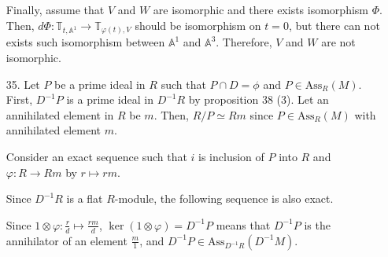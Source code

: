 \documentclass[12pt]{article}
\begin{document}
\begin{enumerate}
Finally, assume that $V$ and $W$ are isomorphic and there exists isomorphism $\Phi$. Then, $d\Phi:\mathbb{T}_{t, \mathbb{A}^1}\rightarrow \mathbb{T}_{\varphi(t),V}$ should be isomorphism on $t=0$, but there can not exists such isomorphism between $\mathbb{A}^1$ and $\mathbb{A}^3$. Therefore, $V$ and $W$ are not isomorphic.
\newpage
\item[35.] Let $P$ be a prime ideal in $R$ such that $P\cap D=\phi$ and $P\in \text{Ass}_R(M)$. First, $D^{-1}P$ is a prime ideal in $D^{-1}R$ by proposition 38 (3). Let an annihilated element in $R$ be $m$. Then, $R/P \simeq Rm$ since $P\in \text{Ass}_R(M)$ with annihilated element $m$.

Consider an exact sequence such that $i$ is inclusion of $P$ into $R$ and $\varphi:R\rightarrow Rm$ by $r\mapsto rm$.
\begin{figure}[h]
\centering
{}
\end{figure}
Since $D^{-1}R$ is a flat $R$-module, the following sequence is also exact.
\begin{figure}[h]
\centering
{}
\end{figure}
Since $1\otimes \varphi: \frac{r}{d}\mapsto \frac{rm}{d}$, $\ker (1\otimes \varphi)=D^{-1}P$ means that $D^{-1}P$ is the annihilator of an element $\frac{m}{1}$, and $D^{-1}P\in \text{Ass}_{D^{-1}R}(D^{-1}M)$.
\end{enumerate}
\end{document}
